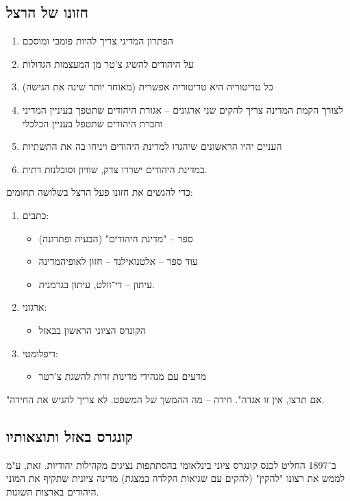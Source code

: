 \documentclass[a4paper]{book}
\begin{document}
	\subsection{חזונו של הרצל}
	\begin{enumerate}
		\item הפתרון המדיני צריך להיות פומבי ומוסכם
		\item על היהודים להשיג צ'טר מן המעצמות הגדולות
		\item כל טריטוריה היא טריטוריה אפשרית (מאוחר יותר שינה את הגישה)
		\item לצורך הקמת המדינה צריך להקים שני ארגונים – אגורת היהודים שתטפך בעיניין המדיני וחברת היהודים שתטפל בעניין הכלכלי
		\item העניים יהיו הראשונים שיהגרו למדינת היהודים ויניחו בה את התשתיות
		\item במדינת היהודים ישררו צדק, שוויון וסובלנות דתית. 
	\end{enumerate}
	כדי להגשים את חזונו פעל הרצל בשלושה תחומים: 
	\begin{enumerate}
		\item כתבים: 
		\begin{itemize}
			\item ספר – "מדינת היהודים" (הבעיה ופתרונה)
			\item עוד ספר – אלטנואילנד – חזון לאופיהמדינה
			\item עיתון – די־וולט, עיתון בגרמנית. 
		\end{itemize}
		\item ארגוני: 
		\begin{itemize}
			\item הקונרס הציוני הראשון בבאזל
		\end{itemize}
		\item דיפלומטי: 
		\begin{itemize}
			\item מדעים עם מנהידי מדינות זרות להשגת צ'רטר
		\end{itemize}
	\end{enumerate}
	
	"אם תרצו, אין זו אגדה". חידה – מה ההמשך של המשפט. לא צריך להגיש את החידה. 
	
	\subsection{קונגרס באזל ותוצאותיו}
	ב־1897 החליט לכנס קונגרס ציוני בינלאומי בהסתתפות נציגים מקהילות יהודיות. זאת, ע"מ לממש את רצונו "להקין" (להקים עם שגיאות הקלדה במצגת) מדינה ציונית שתקיף את המוני היהודים בארצות השונות. 
	
\end{document}
